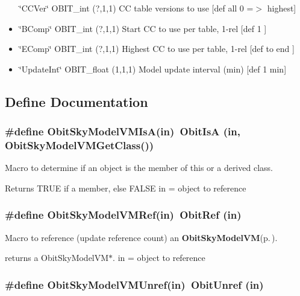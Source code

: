 \begin{itemize}
\char`\"{}CCVer\char`\"{} OBIT\_\-int (?,1,1) CC table versions to use [def all 0 =$>$ highest] \item \char`\"{}BComp\char`\"{} OBIT\_\-int (?,1,1) Start CC to use per table, 1-rel [def 1 ] \item \char`\"{}EComp\char`\"{} OBIT\_\-int (?,1,1) Highest CC to use per table, 1-rel [def to end ] \item \char`\"{}Update\-Int\char`\"{} OBIT\_\-float (1,1,1) Model update interval (min) [def 1 min]\end{itemize}


\subsection{Define Documentation}
\subsubsection{\setlength{\rightskip}{0pt plus 5cm}\#define Obit\-Sky\-Model\-VMIs\-A(in)\ Obit\-Is\-A (in, Obit\-Sky\-Model\-VMGet\-Class())}\label{ObitSkyModelVM_8h_a2}


Macro to determine if an object is the member of this or a derived class. 

Returns TRUE if a member, else FALSE in = object to reference 
\subsubsection{\setlength{\rightskip}{0pt plus 5cm}\#define Obit\-Sky\-Model\-VMRef(in)\ Obit\-Ref (in)}\label{ObitSkyModelVM_8h_a1}


Macro to reference (update reference count) an {\bf Obit\-Sky\-Model\-VM}{\rm (p.\,\pageref{structObitSkyModelVM})}. 

returns a Obit\-Sky\-Model\-VM$\ast$. in = object to reference 
\subsubsection{\setlength{\rightskip}{0pt plus 5cm}\#define Obit\-Sky\-Model\-VMUnref(in)\ Obit\-Unref (in)}\label{ObitSkyModelVM_8h_a0}


